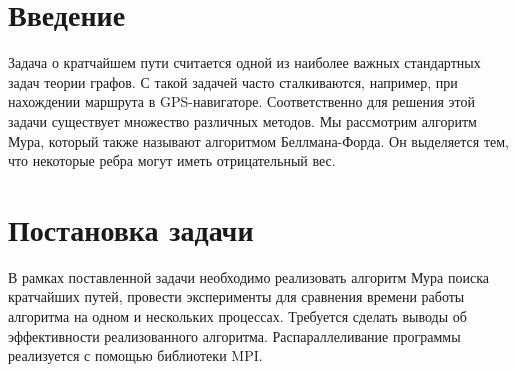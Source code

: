 \documentclass{report}
\begin{document}
\setcounter{page}{2}

\tableofcontents
\newpage

\section*{Введение}
\par Задача о кратчайшем пути считается одной из наиболее важных стандартных задач теории графов. С такой задачей часто сталкиваются, например, при нахождении маршрута в GPS-навигаторе. Соответственно для решения этой задачи существует множество различных методов. Мы рассмотрим алгоритм Мура, который также называют алгоритмом Беллмана-Форда. Он выделяется тем, что некоторые ребра могут иметь отрицательный вес.
\newpage

\section*{Постановка задачи}
\par В рамках поставленной задачи необходимо реализовать алгоритм Мура поиска кратчайших путей, провести эксперименты для сравнения времени работы алгоритма на одном и нескольких процессах. Требуется сделать выводы об эффективности реализованного алгоритма. Распараллеливание программы реализуется с помощью библиотеки MPI.
\newpage

\end{document}
